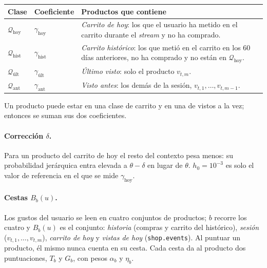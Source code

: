 \documentclass[11pt,a4paper]{article}
\newcommand{\cod}[1]{\texttt{#1}}
\begin{document}
\begin{center}
\begin{tabular}{llp{9.2cm}}
\toprule
Clase & Coeficiente & Productos que contiene\\
\midrule
$\mathcal Q_{\text{hoy}}$ & $\gamma_{\text{hoy}}$ & \emph{Carrito de hoy}: los que el usuario ha metido en el carrito durante el \emph{stream} y no ha comprado.\\
$\mathcal Q_{\text{hist}}$ & $\gamma_{\text{hist}}$ & \emph{Carrito histórico}: los que metió en el carrito en los 60 días anteriores, no ha comprado y no están en $\mathcal Q_{\text{hoy}}$.\\
$\mathcal Q_{\text{últ}}$ & $\gamma_{\text{últ}}$ & \emph{Último visto}: solo el producto $v_{t,m}$.\\
$\mathcal Q_{\text{ant}}$ & $\gamma_{\text{ant}}$ & \emph{Visto antes}: los demás de la sesión, $v_{t,1},\dots,v_{t,m-1}$.\\
\bottomrule
\end{tabular}
\end{center}

Un producto puede estar en una clase de carrito y en una de vistos a la vez; entonces se suman sus dos
coeficientes.

\paragraph{Corrección $\delta$.} Para un producto del carrito de hoy el resto del contexto pesa menos:
su probabilidad jerárquica entra elevada a $\theta-\delta$ en lugar de $\theta$. $h_0=10^{-3}$ es solo
el valor de referencia en el que se mide $\gamma_{\text{hoy}}$.

\paragraph{Cestas $B_b(u)$.} Los gustos del usuario se leen en cuatro conjuntos de productos; $b$
recorre los cuatro y $B_b(u)$ es el conjunto: \emph{historia} (compras y carrito del histórico),
\emph{sesión} ($v_{t,1},\dots,v_{t,m}$), \emph{carrito de hoy} y \emph{vistas de hoy}
(\cod{shop.events}). Al puntuar un producto, él mismo nunca cuenta en su cesta. Cada cesta da al producto
dos puntuaciones, $T_b$ y $G_b$, con pesos $\alpha_b$ y $\eta_b$.
\end{document}
